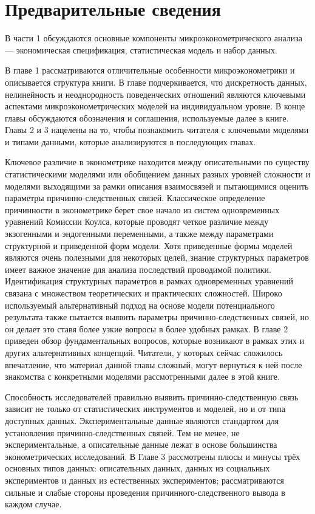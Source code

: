 

\part{Предварительные сведения}

В части 1 обсуждаются основные компоненты микроэконометрического анализа --- экономическая спецификация, статистическая модель и набор данных. 

В главе 1 рассматриваются отличительные особенности микроэконометрики и описывается структура книги.  В главе подчеркивается, что дискретность данных, нелинейность и неоднородность поведенческих отношений являются ключевыми аспектами микроэконометрических моделей на индивидуальном уровне. В конце главы обсуждаются обозначения и соглашения, используемые далее в книге.
Главы 2 и 3 нацелены на то, чтобы познакомить читателя с ключевыми моделями и типами данными, которые анализируются в последующих главах.


Ключевое различие в эконометрике находится между  описательными по существу статистическими моделями или обобщением данных разных уровней сложности и моделями выходящими за рамки описания взаимосвязей и пытающимися оценить параметры причинно-следственных связей. 
Классическое определение причинности в эконометрике берет свое начало из систем одновременных уравнений Комиссии Коулса, которые проводят четкое различие между экзогенными и эндогенными переменными, а также между параметрами структурной и приведенной форм модели. 
Хотя приведенные формы моделей являются очень полезными для некоторых целей, знание структурных параметров имеет важное значение для анализа последствий проводимой политики. 
Идентификация структурных параметров в рамках одновременных уравнений связана с множеством теоретических и практических сложностей. Широко используемый альтернативный подход на основе модели потенциального результата также пытается выявить параметры причинно-следственных связей, но он делает это ставя более узкие вопросы в более удобных рамках. В главе 2 приведен обзор фундаментальных вопросов, которые возникают в рамках этих и других альтернативных концепций. Читатели, у которых сейчас сложилось впечатление, что материал данной главы сложный, могут вернуться к ней после знакомства с конкретными моделями рассмотренными далее в этой книге.
	
	
Способность исследователей правильно выявить причинно-следственную связь зависит не только от статистических инструментов и моделей, но и от типа доступных данных. Экспериментальные данные являются стандартом для установления причинно-следственных связей. Тем не менее, не экспериментальные, а описательные данные лежат в основе большинства эконометрических исследований. В Главе 3 рассмотрены  плюсы и минусы трёх основных типов данных: описательных данных, данных из социальных экспериментов и данных из естественных экспериментов; рассматриваются сильные и слабые стороны проведения причинного-следственного вывода в каждом случае.

